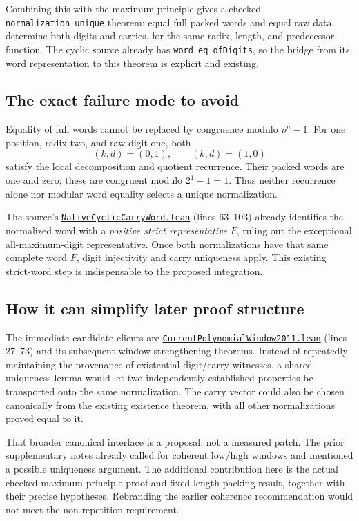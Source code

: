\documentclass[11pt,letterpaper]{article}
\newcommand{\code}[1]{\nolinkurl{#1}}
\newcommand{\src}[2]{\href{https://github.com/VladimirReshetnikov/ProveIt/blob/e73fa2e916c9bb6f61c79e4fe2cd02b5f43e9d11/Computability/DiophantineConsistency/Lean/DiophantineConsistency/#1.lean}{\nolinkurl{#1.lean}} (lines #2)}
\begin{document}
Combining this with the maximum principle gives a checked \code{normalization_unique} theorem: equal full packed words and equal raw data determine both digits and carries, for the same radix, length, and predecessor function. The cyclic source already has \code{word_eq_ofDigits}, so the bridge from its word representation to this theorem is explicit and existing.

\subsection{The exact failure mode to avoid}

Equality of full words cannot be replaced by congruence modulo \(\rho^n-1\). For one position, radix two, and raw digit one, both
\[
 (k,d)=(0,1),\qquad (k,d)=(1,0)
\]
satisfy the local decomposition and quotient recurrence. Their packed words are one and zero; these are congruent modulo \(2^1-1=1\). Thus neither recurrence alone nor modular word equality selects a unique normalization.

The source's \src{NativeCyclicCarryWord}{63--103} already identifies the normalized word with a \emph{positive strict representative} \(F\), ruling out the exceptional all-maximum-digit representative. Once both normalizations have that same complete word \(F\), digit injectivity and carry uniqueness apply. This existing strict-word step is indispensable to the proposed integration.

\subsection{How it can simplify later proof structure}

The immediate candidate clients are \src{CurrentPolynomialWindow2011}{27--73} and its subsequent window-strengthening theorems. Instead of repeatedly maintaining the provenance of existential digit/carry witnesses, a shared uniqueness lemma would let two independently established properties be transported onto the same normalization. The carry vector could also be chosen canonically from the existing existence theorem, with all other normalizations proved equal to it.

That broader canonical interface is a proposal, not a measured patch. The prior supplementary notes already called for coherent low/high windows and mentioned a possible uniqueness argument. The additional contribution here is the actual checked maximum-principle proof and fixed-length packing result, together with their precise hypotheses. Rebranding the earlier coherence recommendation would not meet the non-repetition requirement.
\end{document}
